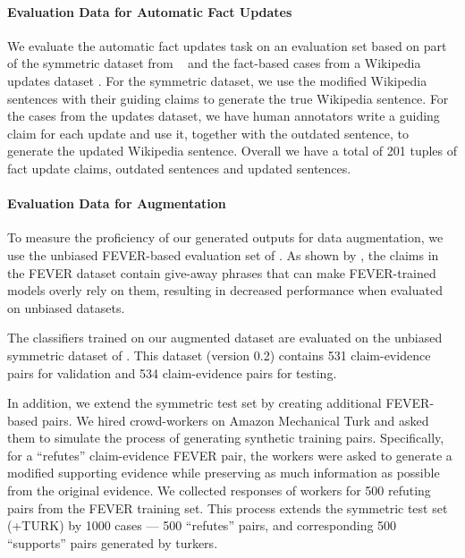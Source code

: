 \documentclass[letterpaper]{article}
\begin{document}
\paragraph{Evaluation Data for Automatic Fact Updates}
We evaluate the automatic fact updates task on an evaluation set based on part of the symmetric dataset from ~\cite{schuster2019towards} and the fact-based cases from a Wikipedia updates dataset \cite{yang-etal-2017-identifying-semantic}. For the symmetric dataset, we use the modified Wikipedia sentences with their guiding claims to generate the true Wikipedia sentence. For the cases from the updates dataset, we have human annotators write a guiding claim for each update and use it, together with the outdated sentence, to generate the updated Wikipedia sentence.
Overall we have a total of 201 tuples of fact update claims, outdated sentences and updated sentences.






\paragraph{Evaluation Data for Augmentation}


To measure the proficiency of our generated outputs for data augmentation, we use the unbiased FEVER-based evaluation set of \cite{schuster2019towards}.
As shown by \cite{schuster2019towards}, the claims in the FEVER dataset contain give-away phrases that can make FEVER-trained models overly rely on them, resulting in decreased performance when evaluated on unbiased datasets.

The classifiers trained on our augmented dataset are evaluated on the unbiased symmetric dataset of \cite{schuster2019towards}. This dataset (version 0.2) contains 531 claim-evidence pairs for validation and 534 claim-evidence pairs for testing.


In addition, we extend the symmetric test set by creating additional FEVER-based pairs.
We hired crowd-workers on Amazon Mechanical Turk and asked them to simulate the process of generating synthetic training pairs. Specifically, for a ``refutes'' claim-evidence FEVER pair, the workers were asked to generate a modified supporting evidence while preserving as much information as possible from the original evidence. We collected responses of workers for 500 refuting pairs from the FEVER training set.
This process extends the symmetric test set (\textsc{+TURK}) by 1000 cases --- 500 ``refutes'' pairs, and corresponding 500 ``supports'' pairs generated by turkers.
\end{document}

